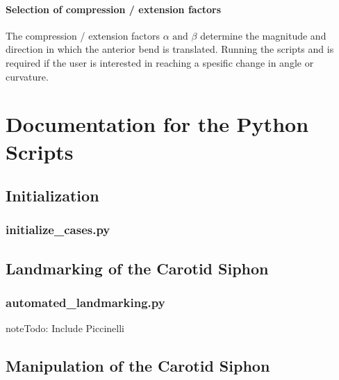\documentclass[letterpaper,10pt,english]{sphinxmanual}
\begin{document}
\subsubsection{Selection of compression / extension factors}
\label{\detokenize{getting_started:selection-of-compression-extension-factors}}
The compression / extension factors \(\alpha \text{ and } \beta\) determine the magnitude and direction in which the anterior bend is translated.
Running the scripts   and  is required if the user is interested in reaching a spesific change in angle or curvature.


\chapter{Documentation for the Python Scripts}
\label{\detokenize{scripts:documentation-for-the-python-scripts}}\label{\detokenize{scripts::doc}}

\section{Initialization}
\label{\detokenize{scripts:initialization}}

\subsection{initialize\_cases.py}
\label{\detokenize{scripts:initialize-cases-py}}

\section{Landmarking of the Carotid Siphon}
\label{\detokenize{scripts:landmarking-of-the-carotid-siphon}}

\subsection{automated\_landmarking.py}
\label{\detokenize{scripts:automated-landmarking-py}}
\begin{sphinxadmonition}{note}{\label{scripts:index-0}Todo:}
Include Piccinelli
\end{sphinxadmonition}


\section{Manipulation of the Carotid Siphon}
\label{\detokenize{scripts:manipulation-of-the-carotid-siphon}}
\end{document}
